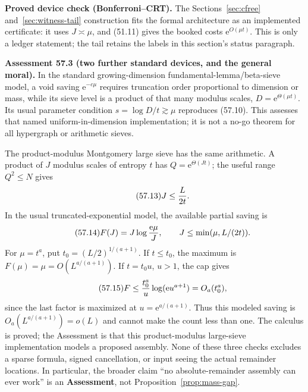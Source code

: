 \documentclass[10pt,reqno]{amsart}
\theoremstyle{definition}
\newcommand{\e}{\mathrm e}
\newcommand{\1}{\mathbf 1}
\begin{document}
\medskip\noindent\textbf{Proved device check (Bonferroni--CRT).}
The Sections~\ref{sec:cfree} and~\ref{sec:witness-tail} construction fits
the formal architecture as an implemented certificate: it uses
$J\asymp\mu$, and (51.11) gives the booked costs $\e^{O(\mu t)}$.  This is
only a ledger statement; the tail retains the labels in this section's
status paragraph.

\medskip\noindent\textbf{Assessment 57.3 (two further standard devices,
and the general moral).}
In the standard growing-dimension fundamental-lemma/beta-sieve model, a void
saving $\e^{-c\mu}$ requires truncation order proportional to dimension or
mass, while its sieve level is a product of that many modulus scales,
$D=\e^{\Theta(\mu t)}$.  Its usual parameter condition
$s=\log D/t\gtrsim\mu$ reproduces (57.10).  This assesses that named
uniform-in-dimension implementation; it is not a no-go theorem for all
hypergraph or arithmetic sieves.

The product-modulus Montgomery large sieve has the same arithmetic.  A
product of $J$ modulus scales of entropy $t$ has
$Q=\e^{\Theta(Jt)}$; the useful range $Q^2\leq N$ gives
\begin{equation}\tag{57.13}
                              J\leq {L\over2t}.
\end{equation}
In the usual truncated-exponential model, the available partial saving is
\begin{equation}\tag{57.14}
 F(J)=J\log{\e\mu\over J},\qquad
 J\leq\min(\mu,L/(2t)).
\end{equation}
For $\mu=t^a$, put $t_0=(L/2)^{1/(a+1)}$.  If $t\leq t_0$, the maximum is
$F(\mu)=\mu=O(L^{a/(a+1)})$.  If $t=t_0u$, $u>1$, the cap gives
\begin{equation}\tag{57.15}
 F\leq {t_0^a\over u}\log(\e u^{a+1})=O_a(t_0^a),
\end{equation}
since the last factor is maximized at $u=\e^{a/(a+1)}$.  Thus this modeled
saving is $O_a(L^{a/(a+1)})=o(L)$ and cannot make the count less than one.
The calculus is proved; the Assessment is that this product-modulus
large-sieve implementation models a proposed assembly.  None of these three
checks excludes a sparse formula, signed cancellation, or input seeing the
actual remainder locations.  In particular, the broader claim ``no
absolute-remainder assembly can ever work'' is an \textbf{Assessment}, not
Proposition~\ref{prop:mass-gap}.
\end{document}
